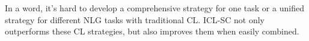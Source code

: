 In a word, it's hard to develop a 
comprehensive strategy for one task or a unified strategy for different NLG tasks with traditional CL. 
ICL-SC not only outperforms these CL strategies, but also improves them when easily combined. 

\label{sec:tracl}






